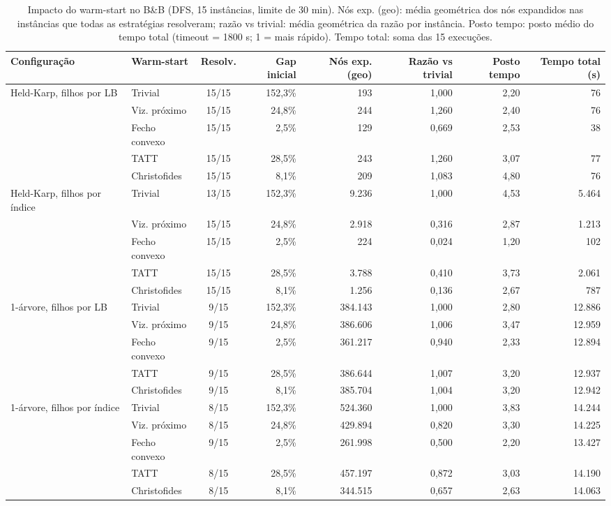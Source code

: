 \begin{table}[htb]
\centering
\caption{Impacto do warm-start no B\&B (DFS, 15 instâncias, limite de 30 min). Nós exp. (geo): média geométrica dos nós expandidos nas instâncias que todas as estratégias resolveram; razão vs trivial: média geométrica da razão por instância. Posto tempo: posto médio do tempo total (timeout = 1800 s; 1 = mais rápido). Tempo total: soma das 15 execuções.}
\label{tab:warmstart}
\small
\setlength{\tabcolsep}{4pt}
\begin{adjustbox}{max width=\linewidth}
\begin{tabular}{llcrrrrr}
\toprule
Configuração & Warm-start & Resolv. & Gap inicial & Nós exp. (geo) & Razão vs trivial & Posto tempo & Tempo total (s) \\
\midrule
Held-Karp, filhos por LB & Trivial & 15/15 & 152{,}3\% & 193 & 1{,}000 & 2{,}20 & 76 \\
 & Viz. próximo & 15/15 & 24{,}8\% & 244 & 1{,}260 & 2{,}40 & 76 \\
 & Fecho convexo & 15/15 & 2{,}5\% & 129 & 0{,}669 & 2{,}53 & 38 \\
 & TATT & 15/15 & 28{,}5\% & 243 & 1{,}260 & 3{,}07 & 77 \\
 & Christofides & 15/15 & 8{,}1\% & 209 & 1{,}083 & 4{,}80 & 76 \\
\midrule
Held-Karp, filhos por índice & Trivial & 13/15 & 152{,}3\% & 9.236 & 1{,}000 & 4{,}53 & 5.464 \\
 & Viz. próximo & 15/15 & 24{,}8\% & 2.918 & 0{,}316 & 2{,}87 & 1.213 \\
 & Fecho convexo & 15/15 & 2{,}5\% & 224 & 0{,}024 & 1{,}20 & 102 \\
 & TATT & 15/15 & 28{,}5\% & 3.788 & 0{,}410 & 3{,}73 & 2.061 \\
 & Christofides & 15/15 & 8{,}1\% & 1.256 & 0{,}136 & 2{,}67 & 787 \\
\midrule
1-árvore, filhos por LB & Trivial & 9/15 & 152{,}3\% & 384.143 & 1{,}000 & 2{,}80 & 12.886 \\
 & Viz. próximo & 9/15 & 24{,}8\% & 386.606 & 1{,}006 & 3{,}47 & 12.959 \\
 & Fecho convexo & 9/15 & 2{,}5\% & 361.217 & 0{,}940 & 2{,}33 & 12.894 \\
 & TATT & 9/15 & 28{,}5\% & 386.644 & 1{,}007 & 3{,}20 & 12.937 \\
 & Christofides & 9/15 & 8{,}1\% & 385.704 & 1{,}004 & 3{,}20 & 12.942 \\
\midrule
1-árvore, filhos por índice & Trivial & 8/15 & 152{,}3\% & 524.360 & 1{,}000 & 3{,}83 & 14.244 \\
 & Viz. próximo & 8/15 & 24{,}8\% & 429.894 & 0{,}820 & 3{,}30 & 14.225 \\
 & Fecho convexo & 9/15 & 2{,}5\% & 261.998 & 0{,}500 & 2{,}20 & 13.427 \\
 & TATT & 8/15 & 28{,}5\% & 457.197 & 0{,}872 & 3{,}03 & 14.190 \\
 & Christofides & 8/15 & 8{,}1\% & 344.515 & 0{,}657 & 2{,}63 & 14.063 \\
\bottomrule
\end{tabular}
\end{adjustbox}
\end{table}
